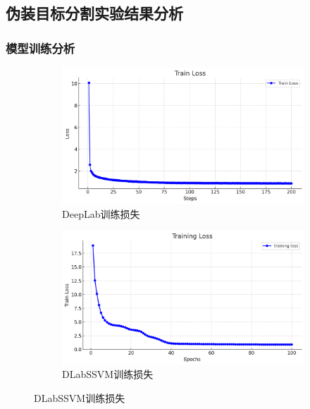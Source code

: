 \documentclass[a4paper,12pt]{ctexart}
\begin{document}
\subsection{伪装目标分割实验结果分析}
\subsubsection{模型训练分析}

\begin{figure}[h!]
    \centering
    \begin{subfigure}{0.4\textwidth}
        \centering
        \includegraphics[width=\linewidth]{figures/deeplab_train_loss.png}
        \caption{DeepLab训练损失}
        \label{fig:dlabloss}
    \end{subfigure}%
    \hspace{0.1\textwidth}
    \begin{subfigure}{0.4\textwidth}
        \centering
        \includegraphics[width=\linewidth]{figures/ssvm_train_loss.png}
        \caption{DLabSSVM训练损失}
        \label{fig:dssvmloss}
    \end{subfigure}%
    \hspace{0.1\textwidth}

\end{figure}
\end{document}
